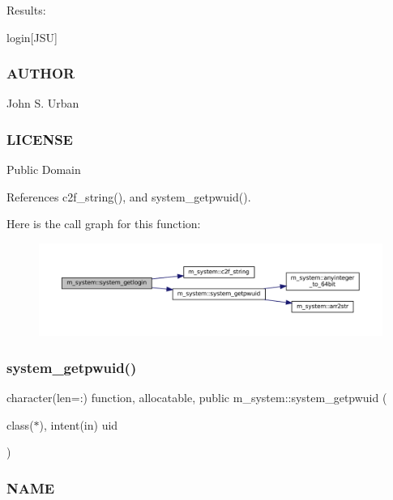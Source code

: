 Results\+:

login\mbox{[}J\+SU\mbox{]}

\subsubsection*{A\+U\+T\+H\+OR}

John S. Urban \subsubsection*{L\+I\+C\+E\+N\+SE}

Public Domain 

References c2f\+\_\+string(), and system\+\_\+getpwuid().

Here is the call graph for this function\+:
\nopagebreak
\begin{figure}[H]
\begin{center}
\leavevmode
\includegraphics[width=350pt]{namespacem__system_a70f78645a1f130734005e190d469529d_cgraph}
\end{center}
\end{figure}
\mbox{\label{namespacem__system_a59cd13de95dc9a65b444f02614ea39ce}} 
\subsubsection{\texorpdfstring{system\+\_\+getpwuid()}{system\_getpwuid()}}
{\footnotesize\ttfamily character(len=\+:) function, allocatable, public m\+\_\+system\+::system\+\_\+getpwuid (\begin{DoxyParamCaption}\item[{class($\ast$), intent(in)}]{uid }\end{DoxyParamCaption})}



\subsubsection*{N\+A\+ME}

